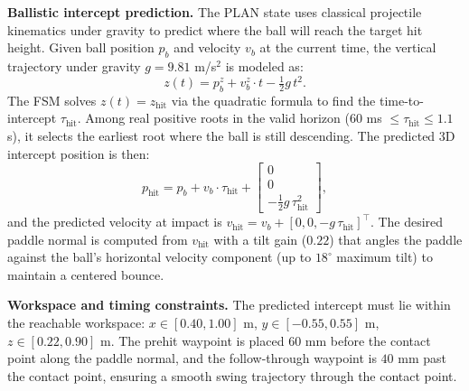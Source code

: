 \documentclass[10pt,twocolumn,letterpaper]{article}
\begin{document}
\textbf{Ballistic intercept prediction.}
The PLAN state uses classical projectile kinematics under gravity to predict where the ball will reach the target hit height. Given ball position $p_b$ and velocity $v_b$ at the current time, the vertical trajectory under gravity $g = 9.81$ m/s$^2$ is modeled as:
\[
z(t) = p_b^z + v_b^z \cdot t - \tfrac{1}{2} g \, t^2.
\]
The FSM solves $z(t) = z_{\mathrm{hit}}$ via the quadratic formula to find the time-to-intercept $\tau_{\mathrm{hit}}$. Among real positive roots in the valid horizon ($60$ ms $\le \tau_{\mathrm{hit}} \le 1.1$ s), it selects the earliest root where the ball is still descending. The predicted 3D intercept position is then:
\[
p_{\mathrm{hit}} = p_b + v_b \cdot \tau_{\mathrm{hit}} + \begin{bmatrix} 0 \\ 0 \\ -\tfrac{1}{2}g\,\tau_{\mathrm{hit}}^2 \end{bmatrix},
\]
and the predicted velocity at impact is $v_{\mathrm{hit}} = v_b + [0, 0, -g\,\tau_{\mathrm{hit}}]^\top$. The desired paddle normal is computed from $v_{\mathrm{hit}}$ with a tilt gain ($0.22$) that angles the paddle against the ball's horizontal velocity component (up to $18^\circ$ maximum tilt) to maintain a centered bounce.

\textbf{Workspace and timing constraints.}
The predicted intercept must lie within the reachable workspace: $x \in [0.40, 1.00]$ m, $y \in [-0.55, 0.55]$ m, $z \in [0.22, 0.90]$ m. The prehit waypoint is placed $60$ mm before the contact point along the paddle normal, and the follow-through waypoint is $40$ mm past the contact point, ensuring a smooth swing trajectory through the contact point.
\end{document}
